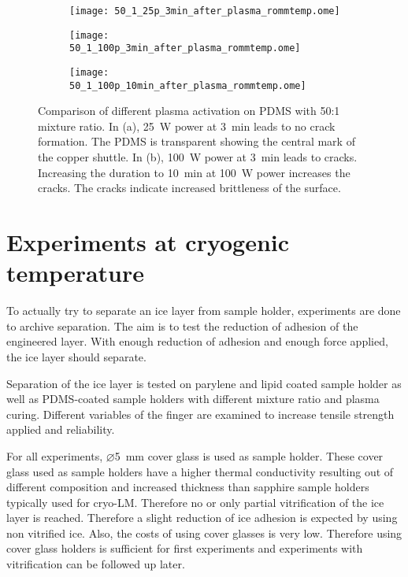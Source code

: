 \begin{figure}[hbt!]
	\centering
	\begin{subfigure}[]{0.45\textwidth}
		\centering
		\texttt{[image: 50\_1\_25p\_3min\_after\_plasma\_rommtemp.ome]}
		\caption{}
	\end{subfigure}
	\begin{subfigure}[]{0.45\textwidth}
		\centering
		\texttt{[image: 50\_1\_100p\_3min\_after\_plasma\_rommtemp.ome]}
		\caption{}
	\end{subfigure}
	\begin{subfigure}[]{0.45\textwidth}
		\centering
		\texttt{[image: 50\_1\_100p\_10min\_after\_plasma\_rommtemp.ome]}
		\caption{}
	\end{subfigure}
	\caption{Comparison of different plasma activation on PDMS with 50:1 mixture ratio. In (a), \SI{25}{\watt} power at \SI{3}{\minute} leads to no crack formation. The PDMS is transparent showing the central mark of the copper shuttle. In (b), \SI{100}{\watt} power at \SI{3}{\minute} leads to cracks. Increasing the duration to \SI{10}{\minute} at \SI{100}{\watt} power increases the cracks. The cracks indicate increased brittleness of the surface.}
	\label{fig:Vgl50:1Plasma}
\end{figure}

\FloatBarrier

\section{Experiments at cryogenic temperature}

To actually try to separate an ice layer from sample holder, experiments are done to archive separation. The aim is to test the reduction of adhesion of the engineered layer. With enough reduction of adhesion and enough force applied, the ice layer should separate.

Separation of the ice layer is tested on parylene and lipid coated sample holder as well as PDMS-coated sample holders with different mixture ratio and plasma curing. Different variables of the finger are examined to increase tensile strength applied and reliability.

For all experiments, $\varnothing$\SI{5}{\milli\meter} cover glass is used as sample holder. These cover glass used as sample holders have a higher thermal conductivity resulting out of different composition and increased thickness than sapphire sample holders typically used for cryo-LM. Therefore no or only partial vitrification of the ice layer is reached. Therefore a slight reduction of ice adhesion is expected by using non vitrified ice. Also, the costs of using cover glasses is very low. Therefore using cover glass holders is sufficient for first experiments and experiments with vitrification can be followed up later.

